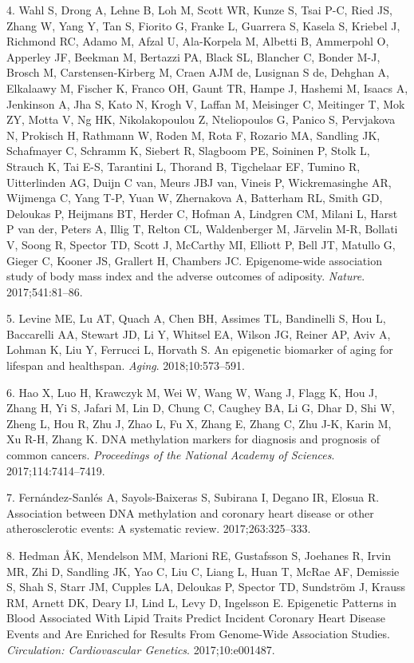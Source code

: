 \documentclass[]{article}
\begin{document}
\leavevmode\hypertarget{ref-Wahl2017}{}%
4. Wahl S, Drong A, Lehne B, Loh M, Scott WR, Kunze S, Tsai P-C, Ried
JS, Zhang W, Yang Y, Tan S, Fiorito G, Franke L, Guarrera S, Kasela S,
Kriebel J, Richmond RC, Adamo M, Afzal U, Ala-Korpela M, Albetti B,
Ammerpohl O, Apperley JF, Beekman M, Bertazzi PA, Black SL, Blancher C,
Bonder M-J, Brosch M, Carstensen-Kirberg M, Craen AJM de, Lusignan S de,
Dehghan A, Elkalaawy M, Fischer K, Franco OH, Gaunt TR, Hampe J, Hashemi
M, Isaacs A, Jenkinson A, Jha S, Kato N, Krogh V, Laffan M, Meisinger C,
Meitinger T, Mok ZY, Motta V, Ng HK, Nikolakopoulou Z, Nteliopoulos G,
Panico S, Pervjakova N, Prokisch H, Rathmann W, Roden M, Rota F, Rozario
MA, Sandling JK, Schafmayer C, Schramm K, Siebert R, Slagboom PE,
Soininen P, Stolk L, Strauch K, Tai E-S, Tarantini L, Thorand B,
Tigchelaar EF, Tumino R, Uitterlinden AG, Duijn C van, Meurs JBJ van,
Vineis P, Wickremasinghe AR, Wijmenga C, Yang T-P, Yuan W, Zhernakova A,
Batterham RL, Smith GD, Deloukas P, Heijmans BT, Herder C, Hofman A,
Lindgren CM, Milani L, Harst P van der, Peters A, Illig T, Relton CL,
Waldenberger M, Järvelin M-R, Bollati V, Soong R, Spector TD, Scott J,
McCarthy MI, Elliott P, Bell JT, Matullo G, Gieger C, Kooner JS,
Grallert H, Chambers JC. Epigenome-wide association study of body mass
index and the adverse outcomes of adiposity. \emph{Nature}.
2017;541:81--86.

\leavevmode\hypertarget{ref-Levine2018}{}%
5. Levine ME, Lu AT, Quach A, Chen BH, Assimes TL, Bandinelli S, Hou L,
Baccarelli AA, Stewart JD, Li Y, Whitsel EA, Wilson JG, Reiner AP, Aviv
A, Lohman K, Liu Y, Ferrucci L, Horvath S. An epigenetic biomarker of
aging for lifespan and healthspan. \emph{Aging}. 2018;10:573--591.

\leavevmode\hypertarget{ref-Hao2017}{}%
6. Hao X, Luo H, Krawczyk M, Wei W, Wang W, Wang J, Flagg K, Hou J,
Zhang H, Yi S, Jafari M, Lin D, Chung C, Caughey BA, Li G, Dhar D, Shi
W, Zheng L, Hou R, Zhu J, Zhao L, Fu X, Zhang E, Zhang C, Zhu J-K, Karin
M, Xu R-H, Zhang K. DNA methylation markers for diagnosis and prognosis
of common cancers. \emph{Proceedings of the National Academy of
Sciences}. 2017;114:7414--7419.

\leavevmode\hypertarget{ref-Fernandez-Sanles2017}{}%
7. Fernández-Sanlés A, Sayols-Baixeras S, Subirana I, Degano IR, Elosua
R. Association between DNA methylation and coronary heart disease or
other atherosclerotic events: A systematic review. 2017;263:325--333.

\leavevmode\hypertarget{ref-Hedman2017}{}%
8. Hedman ÅK, Mendelson MM, Marioni RE, Gustafsson S, Joehanes R, Irvin
MR, Zhi D, Sandling JK, Yao C, Liu C, Liang L, Huan T, McRae AF,
Demissie S, Shah S, Starr JM, Cupples LA, Deloukas P, Spector TD,
Sundström J, Krauss RM, Arnett DK, Deary IJ, Lind L, Levy D, Ingelsson
E. Epigenetic Patterns in Blood Associated With Lipid Traits Predict
Incident Coronary Heart Disease Events and Are Enriched for Results From
Genome-Wide Association Studies. \emph{Circulation: Cardiovascular
Genetics}. 2017;10:e001487.
\end{document}
